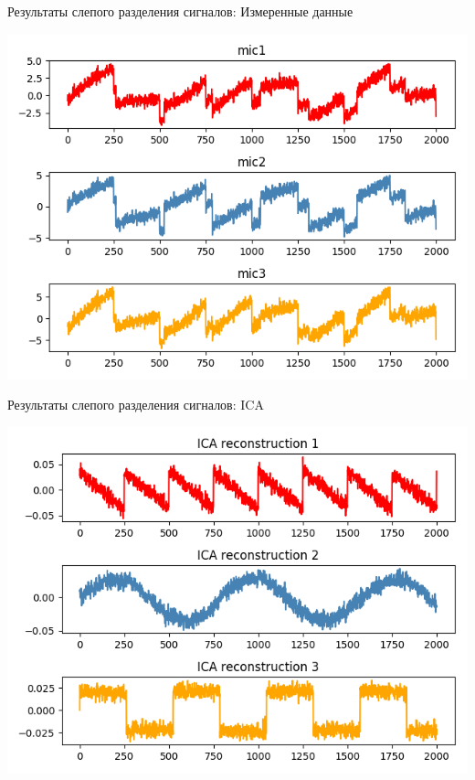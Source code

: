 \documentclass[pdf, intlimits, 9pt, unicode]{beamer}
\begin{document}
\begin{frame}{Результаты слепого разделения сигналов: Измеренные данные}\begin{center}\includegraphics[height=\textheight]{src/3.png}\end{center}\end{frame}
\begin{frame}{Результаты слепого разделения сигналов: ICA}\begin{center}\includegraphics[height=\textheight]{src/3_S_.png}\end{center}\end{frame}
\end{document}
